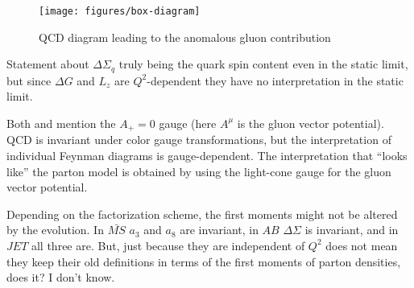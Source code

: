 \begin{figure}
  \centering
  \texttt{[image: figures/box-diagram]}
  \caption{QCD diagram leading to the anomalous gluon contribution}
  \label{fig:box-diagram}
\end{figure}

Statement about \(\Delta \Sigma_q\) truly being the quark spin content even in the static limit, but since \(\Delta G\) and \(L_z\) are \(Q^2\)-dependent they have no interpretation in the static limit.

Both \cite{Jaffe:2001dm} and \cite{Kuhn:2008sy} mention the \(A_{+} = 0\) gauge (here \(A^{\mu}\) is the gluon vector potential).  QCD is invariant under color gauge transformations, but the interpretation of individual Feynman diagrams is gauge-dependent.  The interpretation that ``looks like'' the parton model is obtained by using the light-cone gauge for the gluon vector potential.

Depending on the factorization scheme, the first moments might not be altered
by the evolution. In $\bar{MS}$ $a_3$ and $a_8$ are invariant, in $AB$ $\Delta
\Sigma$ is invariant, and in $JET$ all three are. But, just because they are
independent of $Q^2$ does not mean they keep their old definitions in terms of
the first moments of parton densities, does it? I don't know.
